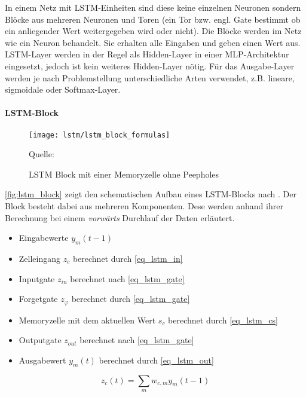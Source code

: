 In einem Netz mit \ac{LSTM}-Einheiten sind diese keine einzelnen Neuronen
sondern Blöcke aus mehreren Neuronen und Toren (ein Tor bzw. engl.
Gate bestimmt ob ein anliegender Wert weitergegeben wird oder nicht).
Die Blöcke werden im Netz wie ein Neuron behandelt. Sie erhalten alle Eingaben
und geben einen Wert aus. \ac{LSTM}-Layer werden in der Regel als Hidden-Layer
in einer \ac{MLP}-Architektur eingesetzt, jedoch ist kein weiteres Hidden-Layer
nötig. Für das Ausgabe-Layer werden je nach Problemstellung unterschiedliche
Arten verwendet, z.B. lineare, sigmoidale oder Softmax-Layer.

\paragraph{\ac{LSTM}-Block}

\begin{figure*}[htfp]
	\begin{center}
	\texttt{[image: lstm/lstm\_block\_formulas]}
	\caption[\acs{LSTM} Block]{\acs{LSTM} Block mit einer Memoryzelle ohne
	Peepholes} \tiny Quelle: \cite{Gers2002b}
	\label{fig:lstm_block}
	\end{center}
\end{figure*}  

\autoref{fig:lstm_block} zeigt den schematischen Aufbau eines \ac{LSTM}-Blocks
nach \cite{Gers2002b}. Der Block besteht dabei aus mehreren Komponenten. Dese
werden anhand ihrer Berechnung bei einem \textit{vorwärts} Durchlauf der Daten
erläutert.
\begin{itemize}
	\item Eingabewerte $y_m(t-1)$
	\item Zelleingang $z_c$ berechnet durch \autoref{eq_lstm_in}
	\item Inputgate $z_{in}$ berechnet nach \autoref{eq_lstm_gate}
	\item Forgetgate $z_\varphi$ berechnet durch \autoref{eq_lstm_gate}
	\item Memoryzelle mit dem aktuellen Wert $s_c$ berechnet durch
	\autoref{eq_lstm_cs}
	\item Outputgate $z_{out}$ berechnet nach \autoref{eq_lstm_gate}
	\item Ausgabewert $y_m(t)$ berechnet durch \autoref{eq_lstm_out}
\end{itemize}

\begin{equation}
\label{eq_lstm_in}
z_{c}(t) = \sum \limits_{m} w_{c,m}y_m(t-1)
\end{equation}

